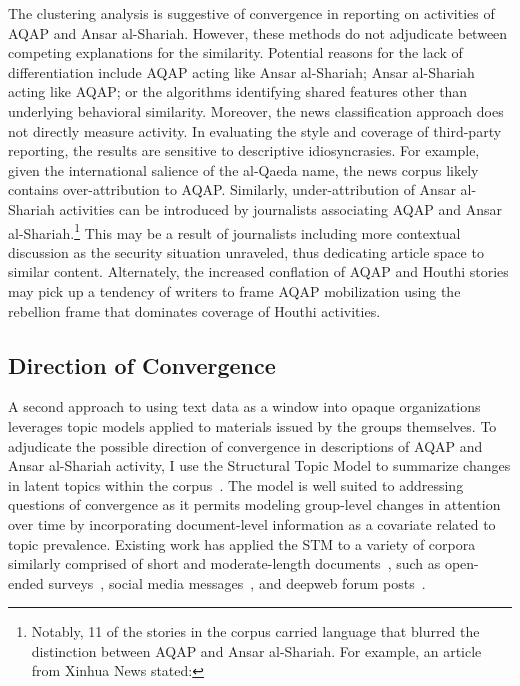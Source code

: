 The clustering analysis is suggestive of convergence in reporting on activities of AQAP and Ansar al-Shariah. However, these methods do not adjudicate between competing explanations for the similarity. Potential reasons for the lack of differentiation include AQAP acting like Ansar al-Shariah; Ansar al-Shariah acting like AQAP; or the algorithms identifying shared features other than underlying behavioral similarity. Moreover, the news classification approach does not directly measure activity. In evaluating the style and coverage of third-party reporting, the results are sensitive to descriptive idiosyncrasies. For example, given the international salience of the al-Qaeda name, the news corpus likely contains over-attribution to AQAP. Similarly, under-attribution of Ansar al-Shariah activities can be introduced by journalists associating AQAP and Ansar al-Shariah.\footnote{Notably, 11 of the stories in the corpus carried language that blurred the distinction between AQAP and  Ansar al-Shariah. For example, an article from Xinhua News stated: }  This may be a result of journalists including more contextual discussion as the security situation unraveled, thus dedicating article space to similar content. Alternately, the increased conflation of AQAP and Houthi stories may pick up a tendency of writers to frame AQAP mobilization using the rebellion frame that dominates coverage of Houthi activities.

\subsection*{Direction of Convergence}
\label{sec:direction-convergence}

A second approach to using text data as a window into opaque organizations leverages topic models applied to materials issued by the groups themselves. To adjudicate the possible direction of convergence in descriptions of AQAP and Ansar al-Shariah activity, I use the Structural Topic Model to summarize changes in latent topics within the corpus~\autocite{roberts2014stm}.  The model is well suited to addressing questions of convergence as it permits modeling group-level changes in attention over time by incorporating document-level information as a covariate related to topic prevalence. Existing work has applied the STM to a variety of corpora similarly comprised of short and moderate-length documents~\autocite{roberts2014structural}, such as open-ended surveys~\autocite{tingley2017rising}, social media messages~\autocite{bail2016cultural}, and deepweb forum posts~\autocite{munksgaard2016mixing}.


